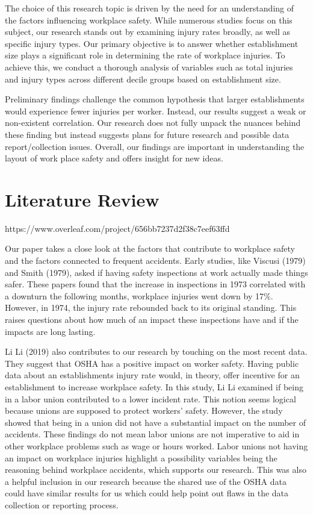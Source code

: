 \documentclass[12pt]{article}
\begin{document}
The choice of this research topic is driven by the need for an understanding of the factors influencing workplace safety. While numerous studies focus on this subject, our research stands out by examining injury rates broadly, as well as specific injury types. Our primary objective is to answer whether establishment size plays a significant role in determining the rate of workplace injuries. To achieve this, we conduct a thorough analysis of variables such as total injuries and injury types across different decile groups based on establishment size.

Preliminary findings challenge the common hypothesis that larger establishments would experience fewer injuries per worker. Instead, our results suggest a weak or non-existent correlation. Our research does not fully unpack the nuances behind these finding but instead suggests plans for future research and possible data report/collection issues. Overall, our findings are important in understanding the layout of work place safety and offers insight for new ideas. 

\section{Literature Review} \label{sec:literature}https://www.overleaf.com/project/656bb7237d2f38c7eef63ffd

Our paper takes a close look at the factors that contribute to workplace safety and the factors connected to frequent accidents. Early studies, like Viscusi (1979) and Smith (1979), asked if having safety inspections at work actually made things safer. These papers found that the increase in inspections in 1973 correlated with a downturn the following months, workplace injuries went down by 17\%. However, in 1974, the injury rate rebounded back to its original standing. This raises questions about how much of an impact these inspections have and if the impacts are long lasting. 

Li Li (2019) also contributes to our research by touching on the most recent data. They suggest that OSHA has a positive impact on worker safety. Having public data about an establishments injury rate would, in theory, offer incentive for an establishment to increase workplace safety. In this study, Li Li examined if being in a labor union contributed to a lower incident rate. This notion seems logical because unions are supposed to protect workers' safety. However, the study showed that being in a union did not have a substantial impact on the number of accidents. These findings do not mean labor unions are not imperative to aid in other workplace problems such as wage or hours worked. Labor unions not having an impact on workplace injuries highlight a possibility variables being the reasoning behind workplace accidents, which supports our research. This was also a helpful inclusion in our research because the shared use of the OSHA data could have similar results for us which could help point out flaws in the data collection or reporting process. 
\end{document}
